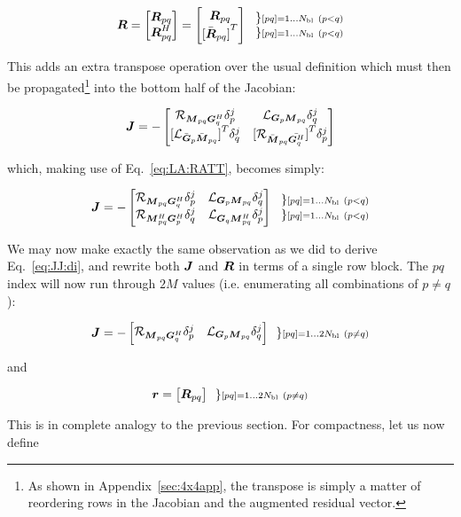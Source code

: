 \documentclass[useAMS,usenatbib]{mn2e}
\newcommand{\mat}[1]{{\bmath{#1}}}
\newcommand{\JJ}{\mat{J}} %
\newcommand{\MM}{\mat{M}}
\newcommand{\RR}{\mat{R}}
\newcommand{\GG}{\mat{G}}
\begin{document}
\[
\bmath{R} = 
\Matrix{c}{
  \RR_{pq} \\ 
  \RR^H_{pq} 
} = 
\Matrix{c}{
  \RR_{pq} \\ 
  {[ \bar{\RR}_{pq} ]}^T
} 
~~ 
\Stack{ 
\} \scriptstyle [pq]=1\dots \Nbl~(p<q) \\ 
\} \scriptstyle [pq]=1\dots \Nbl~(p<q) 
}
\]

This adds an extra transpose operation over the usual definition which must then be propagated\footnote{As shown in Appendix~\ref{sec:4x4app}, the transpose is simply a matter of reordering rows in the Jacobian and the augmented residual vector.} into the bottom half of the Jacobian:

\[
\JJ = - \Matrix{cc}{ 
\Rop{ \MM_{pq}\GG^H_q }\delta^j_p & 
\Lop{ \GG_p \MM_{pq}  }\delta^j_q \\
{[ \Lop{ \bar{\GG}_p    \bar{\MM}_{pq} } ]}^T\delta^j_q & 
{[ \Rop{ \bar{\MM}_{pq} \bar{\GG^H_q}  } ]}^T\delta^j_p  
}
\]

which, making use of Eq.~\ref{eq:LA:RATT}, becomes simply:

\[
\JJ = - \Matrix{cc}{ 
\Rop{ \MM_{pq}\GG^H_q }\delta^j_p & 
\Lop{ \GG_p \MM_{pq}  }\delta^j_q \\
\Rop{ \MM^H_{pq} \GG^H_p } \delta^j_q & 
\Lop{ \GG_q \MM^H_{pq}  } \delta^j_p  
}~~ 
\Stack{ 
\} \scriptstyle [pq]=1\dots \Nbl~(p<q) \\ 
\} \scriptstyle [pq]=1\dots \Nbl~(p<q) 
}
\]

We may now make exactly the same observation as we did to derive Eq.~\ref{eq:JJ:di}, and rewrite both $\JJ$ and $\bmath{R}$ in terms of 
a single row block. The $pq$ index will now run through $2M$ values (i.e. enumerating all combinations of $p\ne q$):

\begin{equation}
\label{eq:JJ:pol}
\JJ = - \Matrix{cc}{ 
\Rop{ \MM_{pq}\GG^H_q }\delta^j_p & 
\Lop{ \GG_p \MM_{pq}  }\delta^j_q \\
}~~ 
\} \scriptstyle [pq]=1\dots 2\Nbl~(p\ne q)\\ 
\end{equation}

and 

\begin{equation}
\bmath{r} = \Matrix{c}{ \mat{R}_{pq}}~~ 
\} \scriptstyle [pq]=1\dots 2\Nbl~(p\ne q)\\ 
\end{equation}

This is in complete analogy to the previous section. For compactness, let us now define
\end{document}
